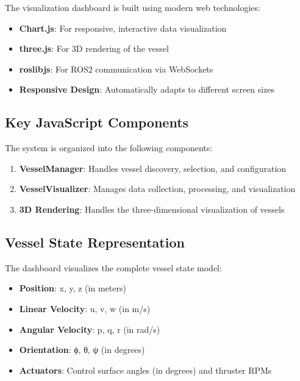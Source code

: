 \documentclass[
  letterpaper,
  DIV=11,
  numbers=noendperiod]{scrreprt}
\providecommand{\tightlist}{%
  \setlength{\itemsep}{0pt}\setlength{\parskip}{0pt}}\usepackage{longtable,booktabs,array}
\begin{document}
The visualization dashboard is built using modern web technologies:

\begin{itemize}
\tightlist
\item
  \textbf{Chart.js}: For responsive, interactive data visualization
\item
  \textbf{three.js}: For 3D rendering of the vessel
\item
  \textbf{roslibjs}: For ROS2 communication via WebSockets
\item
  \textbf{Responsive Design}: Automatically adapts to different screen
  sizes
\end{itemize}

\subsection*{Key JavaScript Components}\label{key-javascript-components}

The system is organized into the following components:

\begin{enumerate}
\def\labelenumi{\arabic{enumi}.}
\tightlist
\item
  \textbf{VesselManager}: Handles vessel discovery, selection, and
  configuration
\item
  \textbf{VesselVisualizer}: Manages data collection, processing, and
  visualization
\item
  \textbf{3D Rendering}: Handles the three-dimensional visualization of
  vessels
\end{enumerate}

\subsection*{Vessel State
Representation}\label{vessel-state-representation}

The dashboard visualizes the complete vessel state model:

\begin{itemize}
\tightlist
\item
  \textbf{Position}: x, y, z (in meters)
\item
  \textbf{Linear Velocity}: u, v, w (in m/s)
\item
  \textbf{Angular Velocity}: p, q, r (in rad/s)
\item
  \textbf{Orientation}: ϕ, θ, ψ (in degrees)
\item
  \textbf{Actuators}: Control surface angles (in degrees) and thruster
  RPMs
\end{itemize}
\end{document}
